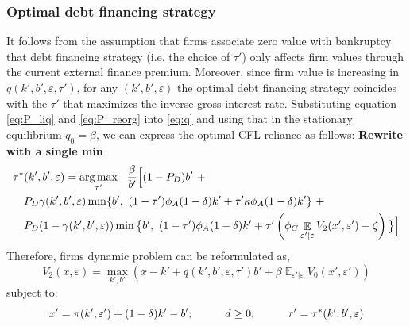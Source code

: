 \documentclass[12pt]{article}
\DeclareMathOperator{\E}{\mathbb{E}}
\DeclareMathOperator*{\argmax}{arg\,max}
\begin{document}
\subsubsection{Optimal debt financing strategy}
It follows from the assumption that firms associate zero value with bankruptcy that debt financing strategy (i.e. the choice of $\tau'$) only affects firm values through the current external finance premium. Moreover, since firm value is increasing in $q(k',b',\varepsilon, \tau')$, for any $(k',b',\varepsilon)$ the optimal debt financing strategy coincides with the $\tau'$ that maximizes the inverse gross interest rate. Substituting equation \ref{eq:P_liq} and \ref{eq:P_reorg} into \ref{eq:q} and using that in the stationary equilibrium $q_0 = \beta$, we can express the optimal CFL reliance as follows: \textbf{Rewrite with a single min}
\begin{equation} \label{eq:opt_tau}
    \begin{split}
        & \tau^*(k',b',\varepsilon) = \argmax_{\tau'} \ \  \frac{\beta}{b'} \Big{[} (1-P_D)b' \ +  \\
        & \quad  P_D \gamma(k',b',\varepsilon) \min\{b', \ (1-\tau') \phi_A (1-\delta) k' +\tau' \kappa \phi_A  (1-\delta) k' \} \ +  \\
        & \quad P_D (1-\gamma(k',b',\varepsilon))  \min\big{\{}b', \ (1-\tau') \phi_A (1-\delta) k' +\tau' \left( \phi_C \E_{\varepsilon'|\varepsilon}V_2 (x', \varepsilon') - \zeta \right) \big{\}} \Big{]} 
    \end{split}
 \end{equation}
Therefore, firms dynamic problem can be reformulated as, 
\begin{equation} \label{eq:V_2}
    V_2(x,\varepsilon) = \max_{k',b'} \left(x - k' +  q(k',b',\varepsilon, \tau')b' + \beta \E_{\varepsilon'|\varepsilon} V_0(x',\varepsilon') \right)
    \end{equation}
    subject to: 
    \begin{equation} \label{eq:cont_1}
    x' = \pi(k',\varepsilon')+(1-\delta)k'-b'; \hspace{10mm} d \geq 0;  \hspace{10mm} \tau' = \tau^*(k',b',\varepsilon)
    \end{equation}
    
\end{document}
